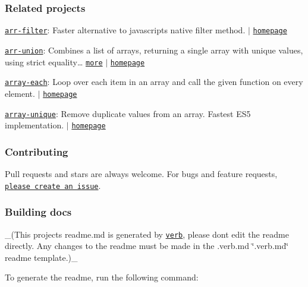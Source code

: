 \subsubsection*{Related projects}


\begin{DoxyItemize}
\item \href{https://www.npmjs.com/package/arr-filter}{\tt arr-\/filter}\+: Faster alternative to javascript\textquotesingle{}s native filter method. $\vert$ \href{https://github.com/jonschlinkert/arr-filter}{\tt homepage}
\item \href{https://www.npmjs.com/package/arr-union}{\tt arr-\/union}\+: Combines a list of arrays, returning a single array with unique values, using strict equality… \href{https://github.com/jonschlinkert/arr-union}{\tt more} $\vert$ \href{https://github.com/jonschlinkert/arr-union}{\tt homepage}
\item \href{https://www.npmjs.com/package/array-each}{\tt array-\/each}\+: Loop over each item in an array and call the given function on every element. $\vert$ \href{https://github.com/jonschlinkert/array-each}{\tt homepage}
\item \href{https://www.npmjs.com/package/array-unique}{\tt array-\/unique}\+: Remove duplicate values from an array. Fastest E\+S5 implementation. $\vert$ \href{https://github.com/jonschlinkert/array-unique}{\tt homepage}
\end{DoxyItemize}

\subsubsection*{Contributing}

Pull requests and stars are always welcome. For bugs and feature requests, \href{../../issues/new}{\tt please create an issue}.

\subsubsection*{Building docs}

\+\_\+(This project\textquotesingle{}s readme.\+md is generated by \href{https://github.com/verbose/verb-generate-readme}{\tt verb}, please don\textquotesingle{}t edit the readme directly. Any changes to the readme must be made in the .verb.\+md \char`\"{}.\+verb.\+md\char`\"{} readme template.)\+\_\+

To generate the readme, run the following command\+:




